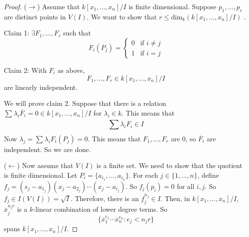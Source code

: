 \documentclass{report}
\begin{document}
    \begin{proof}
        ($\rightarrow $) Assume that $k[x_{1}, \ldots , x_{n}]/I$ is finite dimensional. Suppose $p_{1}, \ldots , p_{r}$ are distinct points in $V(I)$. We want to show that $r \leq \text{dim}_{k}(k[x_{1}, \ldots , x_{n}]/I)$ .

        Claim 1: $\exists F_{1}, \ldots , F_{r}$ such that 
            \begin{equation*}
                F_{i}(P_{j}) = \begin{cases}
                    0 & \text{if $i \neq j$} \\
                    1 & \text{if $i = j$}
                \end{cases}
            \end{equation*}

        Claim 2: With $F_{i}$ as above, 
            \begin{equation*}
                F_{1}, \ldots , F_{r} \in k[x_{1}, \ldots , x_{n}]/I
            \end{equation*}
        are linearly independent.

        We will prove claim 2. Suppose that there is a relation $\sum_{}^{} \lambda_{i} \overline{F}_{i} = 0 \in k[x_{1}, \ldots , x_{n}]/I$ for $\lambda_{i} \in k$. This means that
            \begin{equation*}
                \sum_{}^{} \lambda_{i}F_{i} \in I
            \end{equation*}
        Now $\lambda_{j} = \sum_{}^{} \lambda_{i}F_{i}(P_{j}) = 0$. This means that $F_{1}, \ldots , F_{r}$ are $0$, so $\overline{F}_{i}$ are independent. So we are done.

        ($\leftarrow $) Now assume that $V(I)$ is a finite set. We need to show that the quotient is finite dimensional. Let $P_{i} = \{a_{i_{1}}, \ldots , a_{i_{n}}\}$. For each $j \in \{1, \ldots , n\}$, define $f_{j} = (s_{j} - a_{1_{j}})(x_{j} - a_{2_{j}}) \cdots (x_{j} - a_{i_{j}})$. So $f_{j}(p_{i}) = 0$ for all $i, j$. So $f_{j} \in I(V(I)) = \sqrt{I}$. Therefore, there is an $f_{j}^{n_{j}} \in I$. Then, in $k[x_{1}, \ldots , x_{n}]/I$, $\overline{x}_{j}^{n_{j}r}$ is a $k$-linear combination of lower degree terms. So 
            \begin{equation*}
                \{\overline{x}_{1}^{e_{1}} \cdots  \overline{x}_{n}^{e_{n}}: e_{j} < n_{j}r\}
            \end{equation*}
        spans $k[x_{1}, \ldots , x_{n}]/I$.
    \end{proof} 
\end{document}
